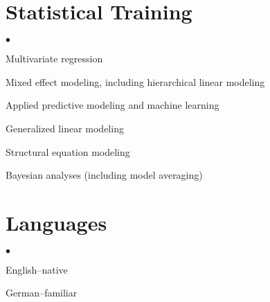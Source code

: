 \documentclass[margin,line]{res}
\newenvironment{list2}{
  \begin{list}{$\bullet$}{%
      \setlength{\itemsep}{0in}
      \setlength{\parsep}{0in} \setlength{\parskip}{0in}
      \setlength{\topsep}{0in} \setlength{\partopsep}{0in} 
      \setlength{\leftmargin}{0.2in}}}{\end{list}}
\begin{document}
\begin{resume}
\section{\sc Statistical Training}
\begin{list2}
\item Multivariate regression
\item Mixed effect modeling, including hierarchical linear modeling
\item Applied predictive modeling and machine learning
\item Generalized linear modeling
\item Structural equation modeling
\item Bayesian analyses (including model averaging)
\end{list2}

\vspace{-2mm}
\section{\sc Languages}

\begin{list2}
\item English--native
\item German--familiar
\end{list2}


\end{resume}
\end{document}
